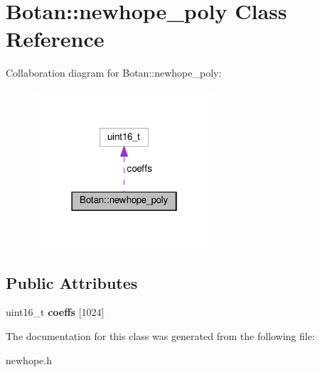 \hypertarget{class_botan_1_1newhope__poly}{}\section{Botan\+:\+:newhope\+\_\+poly Class Reference}
\label{class_botan_1_1newhope__poly}


Collaboration diagram for Botan\+:\+:newhope\+\_\+poly\+:
\nopagebreak
\begin{figure}[H]
\begin{center}
\leavevmode
\includegraphics[width=190pt]{class_botan_1_1newhope__poly__coll__graph}
\end{center}
\end{figure}
\subsection*{Public Attributes}
\begin{DoxyCompactItemize}
\item 
\mbox{\label{class_botan_1_1newhope__poly_a86ee8d64d92642ac9a19e601463e82b2}} 
uint16\+\_\+t {\bfseries coeffs} \mbox{[}1024\mbox{]}
\end{DoxyCompactItemize}


The documentation for this class was generated from the following file\+:\begin{DoxyCompactItemize}
\item 
newhope.\+h\end{DoxyCompactItemize}
